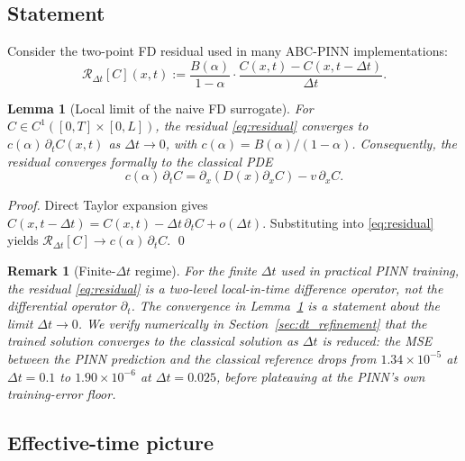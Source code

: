 \documentclass[11pt]{article}
\newtheorem{lemma}{Lemma}
\newtheorem{remark}{Remark}
\begin{document}
\subsection{Statement}

Consider the two-point FD residual used in many ABC-PINN implementations:
\begin{equation}
\mathcal{R}_{\Delta t}[C](x,t) := \frac{B(\alpha)}{1-\alpha}\cdot\frac{C(x,t)-C(x,t-\Delta t)}{\Delta t}.
\label{eq:residual}
\end{equation}

\begin{lemma}[Local limit of the naive FD surrogate]
\label{prop:local_limit}
For \(C\in C^1([0,T]\times[0,L])\), the residual \eqref{eq:residual}
converges to \(c(\alpha)\,\partial_t C(x,t)\) as \(\Delta t\to 0\),
with \(c(\alpha) = B(\alpha)/(1-\alpha)\). Consequently, the residual
converges formally to the classical PDE
\begin{equation}
c(\alpha)\,\partial_t C = \partial_x\!\left(D(x)\partial_x C\right) - v\,\partial_x C.
\label{eq:classical_rescaled}
\end{equation}
\end{lemma}

\begin{proof}
Direct Taylor expansion gives \(C(x,t-\Delta t) = C(x,t) - \Delta t\,\partial_t C + o(\Delta t)\). Substituting into \eqref{eq:residual} yields \(\mathcal{R}_{\Delta t}[C] \to c(\alpha)\,\partial_t C\). \qed
\end{proof}

\begin{remark}[Finite-\(\Delta t\) regime]
\label{rem:finite_dt}
For the finite \(\Delta t\) used in practical PINN training, the residual \eqref{eq:residual} is a two-level local-in-time difference operator, not the differential operator \(\partial_t\). The convergence in Lemma~\ref{prop:local_limit} is a statement about the \emph{limit} \(\Delta t\to 0\). We verify numerically in Section~\ref{sec:dt_refinement} that the trained solution converges to the classical solution as \(\Delta t\) is reduced: the MSE between the PINN prediction and the classical reference drops from \(1.34\times 10^{-5}\) at \(\Delta t=0.1\) to \(1.90\times 10^{-6}\) at \(\Delta t=0.025\), before plateauing at the PINN's own training-error floor.
\end{remark}

\subsection{Effective-time picture}
\end{document}
